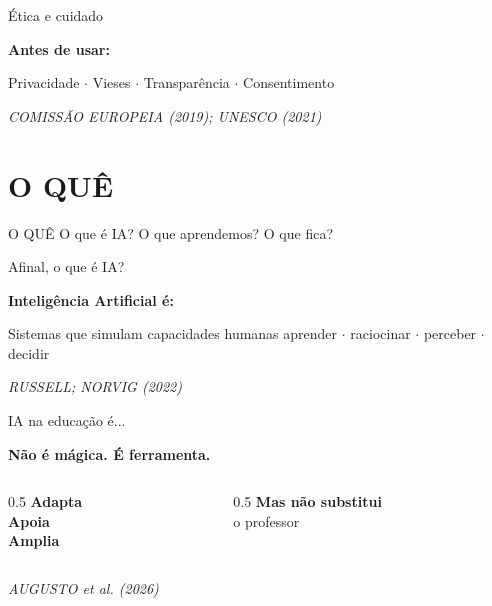 \documentclass[11pt]{beamer}
\newcommand{\citabnt}[1]{%
	\vfill
	\begin{flushright}
		\tiny\textit{#1}
	\end{flushright}
}
\begin{document}
	\begin{frame}{Ética e cuidado}
		\begin{center}
			\Large \textbf{Antes de usar:}
		\end{center}
		\vspace{1em}
		\begin{center}
			\Large
			Privacidade $\cdot$ Vieses $\cdot$ Transparência $\cdot$ Consentimento
		\end{center}
		\citabnt{COMISSÃO EUROPEIA (2019); UNESCO (2021)}
	\end{frame}
	
	\section{O QUÊ}
	
	\begin{frame}{}
		\begin{center}
			\Huge O QUÊ
			\vspace{1em}
			\normalsize
			O que é IA? O que aprendemos? O que fica?
		\end{center}
	\end{frame}
	
	\begin{frame}{Afinal, o que é IA?}
		\begin{center}
			\Large \textbf{Inteligência Artificial é:}
		\end{center}
		\vspace{1em}
		\begin{center}
			Sistemas que simulam capacidades humanas
			\vspace{0.5em}
			\normalsize
			aprender $\cdot$ raciocinar $\cdot$ perceber $\cdot$ decidir
		\end{center}
		\citabnt{RUSSELL; NORVIG (2022)}
	\end{frame}
	
	\begin{frame}{IA na educação é...}
		\begin{center}
			\Large \textbf{Não é mágica. É ferramenta.}
		\end{center}
		\vspace{1em}
		\begin{columns}[T]
			\begin{column}{0.5\textwidth}
				\centering
				\textbf{Adapta}\\
				\textbf{Apoia}\\
				\textbf{Amplia}
			\end{column}
			\begin{column}{0.5\textwidth}
				\centering
				\textbf{Mas não substitui}\\
				\vspace{0.5em}
				\small o professor
			\end{column}
		\end{columns}
		\citabnt{AUGUSTO et al. (2026)}
	\end{frame}
	
\end{document}

